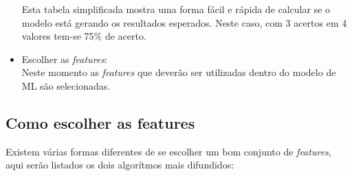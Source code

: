 \begin{itemize}
        Esta tabela simplificada mostra uma forma fácil e rápida de calcular se o modelo está gerando os resultados esperados. Neste caso, com 3 acertos em 4 valores tem-se 75\% de acerto. \cite{brink2015}

        \item Escolher as \textit{features}: \\ Neste momento as \textit{features} que deverão ser utilizadas dentro do modelo de ML são selecionadas.
    \end{itemize}

    \subsection{Como escolher as features}
        Existem várias formas diferentes de se escolher um bom conjunto de \textit{features}, aqui serão listados os dois algorítmos mais difundidos:
